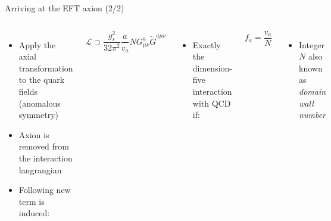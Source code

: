 \documentclass[aspectratio=1610, 9pt]{beamer}
\begin{document}
\begin{frame}{Arriving at the EFT axion (2/2)}
  \begin{columns}
    \column{\textwidth}
    \begin{itemize}
      \item Apply the axial transformation to the quark fields (anomalous symmetry)
      \item Axion is removed from the interaction langrangian
      \item Following new term is induced:
    \end{itemize}
    \begin{equation*}
      \mathcal{L} \supset \frac{g_s^2}{32\pi^2} \frac{a}{v_a} N G^a_{\mu\nu} \tilde{G}^{a\mu\nu}
    \end{equation*}
    \begin{itemize}
      \item Exactly the dimension-five interaction with QCD if:
    \end{itemize}
    \begin{equation*}
      f_a = \frac{v_a}{N}
    \end{equation*}
    \begin{itemize}
      \item Integer $N$ also known as \textit{domain wall number}
    \end{itemize}
  \end{columns} 
\end{frame}
\end{document}
